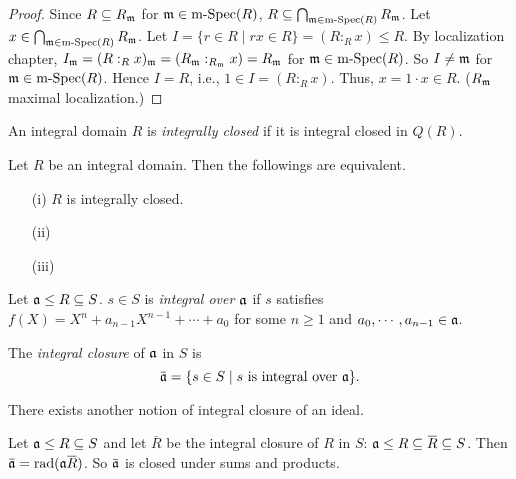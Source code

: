 \begin{proof}
    Since $R \subseteq R_{\mathfrak{m}}$ for $\mathfrak{m} \in \operatorname{m-Spec}(R)$, $R \subseteq \bigcap_{\mathfrak{m} \in \operatorname{m-Spec}(R)}R_{\mathfrak{m}}$. Let $x \in \bigcap_{\mathfrak{m} \in \operatorname{m-Spec}(R)}R_{\mathfrak{m}}$. Let $I = \{r \in R \mid rx \in R\} = (R:_Rx) \leq R$. By localization chapter, $I_{\mathfrak{m}} = (R:_Rx)_{\mathfrak{m}} = (R_{\mathfrak{m}}:_{R_{\mathfrak{m}}}x) = R_{\mathfrak{m}}$ for $\mathfrak{m} \in \operatorname{m-Spec}(R)$. So $I \neq \mathfrak{m}$ for $\mathfrak{m} \in \operatorname{m-Spec}(R)$. Hence $I = R$, i.e., $1 \in I = (R:_Rx)$. Thus, $x = 1 \cdot x \in R$. ($R_{\mathfrak{m}}$ maximal localization.)
\end{proof}

\begin{recall*}
    An integral domain $R$ is \emph{integrally closed} if it is integral closed in $Q(R)$.
\end{recall*}

\begin{proposition}
    Let $R$ be an integral domain. Then the followings are equivalent.
    \begin{enumerate}
        \item[(i)] $R$ is integrally closed.
        \item[(ii)] 
        \item[(iii)]
    \end{enumerate}
\end{proposition}

\begin{definition}
    Let $\mathfrak{a} \leq R \subseteq S$. $s \in S$ is \emph{integral over $\mathfrak{a}$} if $s$ satisfies $f(X) = X^{n} + a_{n-1}X^{n-1} + \cdots + a_0$ for some $n \geq 1$ and $a_0,\cdots,a_{n-1} \in \mathfrak{a}$. \par 
    The \emph{integral closure} of $\mathfrak{a}$ in $S$ is 
    \[\overbar{\ffa} = \{s \in S \mid s \text{ is integral over $\ffa$}\}.\]
\end{definition}

\begin{warning}
    There exists another notion of integral closure of an ideal.
\end{warning}

\begin{lemma}
    Let $\mathfrak{a} \leq R \subseteq S$ and let $\overbar{R}$ be the integral closure of $R$ in $S$: $\ffa \leq R \subseteq \overbar{R} \subseteq S$. Then $\overbar{\ffa} = \operatorname{rad}(\ffa \overbar{R})$. So $\overbar{\ffa}$ is closed under sums and products.
\end{lemma}

